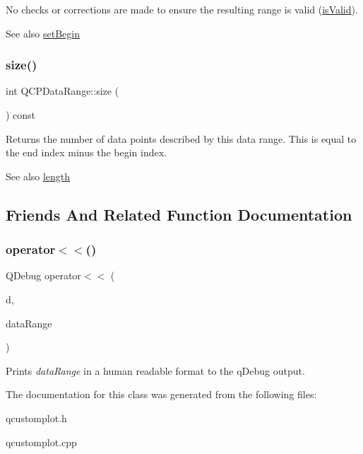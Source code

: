 No checks or corrections are made to ensure the resulting range is valid (\hyperlink{class_q_c_p_data_range_aae53a37472212dca0a7939963e20dba0}{is\+Valid}).

\begin{DoxySeeAlso}{See also}
\hyperlink{class_q_c_p_data_range_a54ff59048e01e46ac4aefafc844626c6}{set\+Begin} 
\end{DoxySeeAlso}
\mbox{\label{class_q_c_p_data_range_ac6af055e509d1b691c244954ff1c5887}} 
\subsubsection{\texorpdfstring{size()}{size()}}
{\footnotesize\ttfamily int Q\+C\+P\+Data\+Range\+::size (\begin{DoxyParamCaption}{ }\end{DoxyParamCaption}) const\hspace{0.3cm}{\ttfamily [inline]}}

Returns the number of data points described by this data range. This is equal to the end index minus the begin index.

\begin{DoxySeeAlso}{See also}
\hyperlink{class_q_c_p_data_range_a1e7836058f755c6ab9f11996477b7150}{length} 
\end{DoxySeeAlso}


\subsection{Friends And Related Function Documentation}
\mbox{\label{class_q_c_p_data_range_a486dd7af8a090ed069672e3510e6a082}} 
\subsubsection{\texorpdfstring{operator$<$$<$()}{operator<<()}}
{\footnotesize\ttfamily Q\+Debug operator$<$$<$ (\begin{DoxyParamCaption}\item[{Q\+Debug}]{d,  }\item[{const \hyperlink{class_q_c_p_data_range}{Q\+C\+P\+Data\+Range} \&}]{data\+Range }\end{DoxyParamCaption})\hspace{0.3cm}{\ttfamily [related]}}

Prints {\itshape data\+Range} in a human readable format to the q\+Debug output. 

The documentation for this class was generated from the following files\+:\begin{DoxyCompactItemize}
\item 
qcustomplot.\+h\item 
qcustomplot.\+cpp\end{DoxyCompactItemize}
